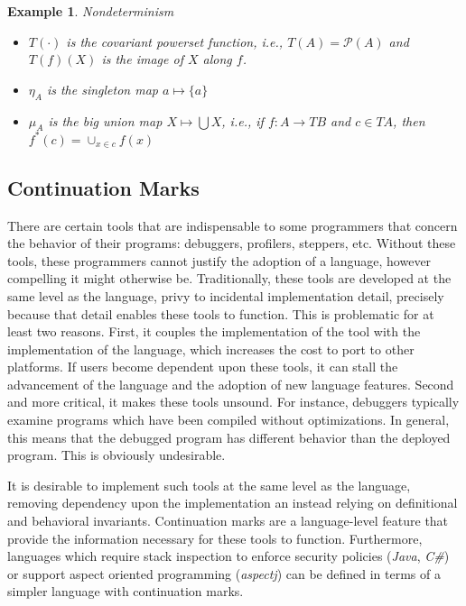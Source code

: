 \documentclass[ms]{byuprop}
\newcounter{definition}
\newcounter{example}
\begin{document}
\newtheorem{nondeterminism}[example]{Example}

\begin{nondeterminism}
Nondeterminism

\begin{itemize}
\item $T(\cdot)$ is the covariant powerset function, i.e., $T(A)=\mathcal{P}(A)$ and 
$T(f)(X)$ is the image of $X$ along $f$.
\item $\eta_{A}$ is the singleton map $a\mapsto \{a\}$
\item $\mu_{A}$ is the big union map $X\mapsto\bigcup X$, i.e., if $f:A\rightarrow TB$ and $c\in TA$, then $f^{*}(c)=\cup_{x\in c}f(x)$
\end{itemize}
\end{nondeterminism}

\subsection{Continuation Marks}

There are certain tools that are indispensable to some programmers that concern the
behavior of their programs: debuggers, profilers, steppers, etc. Without these tools,
these programmers cannot justify the adoption of a language, however compelling it might
otherwise be. Traditionally, these tools are developed at the same level as the 
language, privy to incidental implementation detail, precisely because that detail 
enables these tools to function. This is problematic for at least two reasons. First, 
it couples the implementation of the tool with the implementation of the language, which
increases the cost to port to other platforms. If users become dependent upon these tools,
it can stall the advancement of the language and the adoption of new language features.
Second and more critical, it makes these tools unsound. For instance, debuggers typically
examine programs which have been compiled without optimizations. In general, this means 
that the debugged program has different behavior than the deployed program. This is 
obviously undesirable.

It is desirable to implement such tools at the same level as the language, removing
dependency upon the implementation an instead relying on definitional and behavioral
invariants. Continuation marks are a language-level feature that provide the information
necessary for these tools to function. Furthermore, languages which require stack
inspection to enforce security policies (\emph{Java}, \emph{C\#}) or support aspect
oriented programming (\emph{aspectj}) can be defined in terms of a simpler language with
continuation marks.
\end{document}
